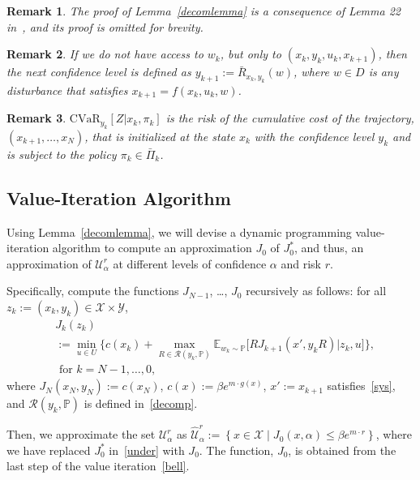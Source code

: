 \documentclass[letterpaper, 10 pt, conference]{ieeeconf}  %
\newtheorem{remark}{Remark}
\begin{document}
\begin{remark}
The proof of Lemma~\ref{decomlemma} is a consequence of Lemma 22 in~\cite{pflug2016time}, and its proof is omitted for brevity. 
\end{remark}
%
%
%
\begin{remark}
If we do not have access to $w_k$, but only to $(x_k, y_k, u_k, x_{k+1})$, then the next confidence level is defined as 
$y_{k+1} := \bar{R}_{x_k, y_k}(w)$, where $w \in D$ is any disturbance that satisfies $x_{k+1} = f(x_k, u_k, w)$.
\end{remark}
%
%
\begin{remark}
$\text{CVaR}_{y_k} [ Z | x_k, \pi_k ]$ is the risk of 
the cumulative cost of the trajectory, $(x_{k+1}, \dots, x_N)$, that is initialized at the state $x_k$ 
with the confidence level $y_k$ and is subject to the policy $\pi_k \in \bar{\Pi}_k$.
\end{remark}

\subsection{Value-Iteration Algorithm}
Using Lemma~\ref{decomlemma}, we will devise a dynamic programming value-iteration algorithm to compute an approximation $J_0$ of $J_0^*$, 
and thus, an approximation of $\mathcal{U}_\alpha^r$ %
at different levels of confidence $\alpha$ and risk $r$.

Specifically, compute the functions $J_{N-1}$, \dots, $J_0$ recursively as follows: for all $z_k := (x_k, y_k) \in \mathcal{X} \times \mathcal{Y}$,
\begin{equation}\begin{aligned}
& J_k(z_k) \\
&:= {\underset{u \in U}\min} \Big\{ c(x_k) + {\underset{R \in \mathcal{R}(y_k, \mathbb{P})}\max} \mathbb{E}_{w_k \sim \mathbb{P}}\big[ R J_{k+1}(x', y_k R) \big| z_k, u \big] \Big\}, \\
& \text{ for }k = N-1, \dots, 0,
\label{bell}\end{aligned}\end{equation}
where $J_N(x_N, y_N) := c(x_N)$, $c(x) := \beta e^{m \cdot g(x)}$, $x' := x_{k+1}$ satisfies~\eqref{sys}, 
and $\mathcal{R}(y_k, \mathbb{P})$ is defined in~\eqref{decomp}. 

Then, we approximate the set $\mathcal{U}_{\alpha}^r$ as $\widehat{\mathcal{U}}_{\alpha}^r := \left\{ x \in \mathcal{X} \mid J_0(x, \alpha) \leq \beta e^{m \cdot r}\right\}$, 
where we have replaced $J_0^*$ in~\eqref{under} with $J_0$. The function, $J_0$, is obtained from the last step of the value iteration~\eqref{bell}. 
\end{document}
